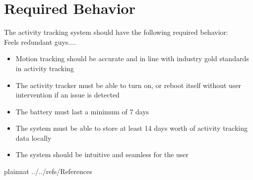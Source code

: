 \documentclass[12pt]{article}
\begin{document}
\newpage

\section{Required Behavior}

The activity tracking system should have the following required behavior: \\
Feels redundant guys....

\begin{itemize}
\item Motion tracking should be accurate and in line with industry gold standards in activity tracking\\
\item The activity tracker must be able to turn on, or reboot itself without user intervention if an issue is detected\\
\item The battery must last a minimum of 7 days\\
\item The system must be able to store at least 14 days worth of activity tracking data locally\\
\item The system should be intuitive and seamless for the user\\
\end{itemize} 

 {plainnat}
 {../../refs/References}

\newpage

\noindent {}
\end{document}
